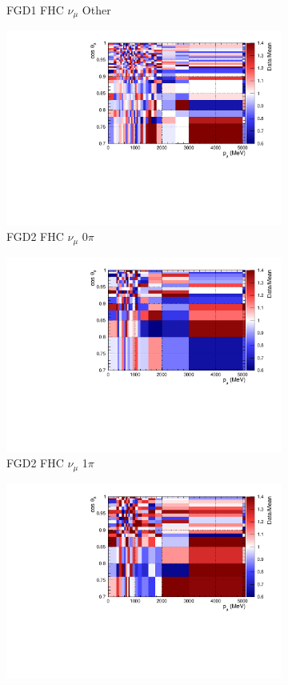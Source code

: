 \begin{figure}
\begin{subfigure}{.32\textwidth}
  \caption{FGD1 FHC $\nu_{\mu}$ Other}
  \label{fig:postpred_FGD1_numuCC_other}
\end{subfigure}
\centering
\begin{subfigure}{.32\textwidth}
  \centering
  \includegraphics[width=0.85\linewidth]{figs/postpred_FGD2_numuCC_0pi.pdf}
  \caption{FGD2 FHC $\nu_{\mu}$ 0$\pi$}
  \label{fig:postpred_FGD2_numuCC_0pi}
\end{subfigure}
\begin{subfigure}{.32\textwidth}
  \centering
  \includegraphics[width=0.85\linewidth]{figs/postpred_FGD2_numuCC_1pi.pdf}
  \caption{FGD2 FHC $\nu_{\mu}$ 1$\pi$}
  \label{fig:postpred_FGD2_numuCC_1pi}
\end{subfigure}
\begin{subfigure}{.32\textwidth}
  \centering
  \includegraphics[width=0.85\linewidth]{figs/postpred_FGD2_numuCC_other.pdf}

\end{subfigure}
\end{figure}
